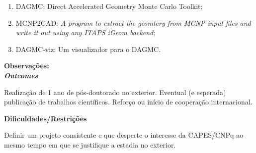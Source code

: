 \begin{enumerate}
	\item DAGMC: Direct Accelerated Geometry Monte Carlo Toolkit;
	\item MCNP2CAD: \textit{A program to extract the geomtery from MCNP input files and write it out using any ITAPS iGeom backend};
	\item DAGMC-viz: Um visualizador para o DAGMC.
\end{enumerate}



\textbf{Observações:}
\\


\textbf{\textit{Outcomes}}

Realização de 1 ano de pós-doutorado no exterior. Eventual (e esperada) publicação 
de trabalhos científicos. Reforço ou início de cooperação internacional.

\textbf{Dificuldades/Restrições}

Definir um projeto consistente e que desperte o interesse da CAPES/CNPq ao mesmo 
tempo em que se justifique a estadia no exterior.


